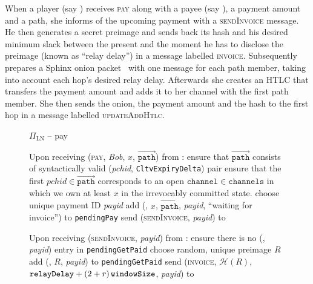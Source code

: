   When a player (say \alice) receives \textsc{pay} along with a payee (say
  \bob), a payment amount and a path, she informs \bob{} of the upcoming payment
  with a \textsc{sendInvoice} message. He then generates a secret preimage and
  sends back its hash and his desired minimum slack between the present and the
  moment he has to disclose the preimage (known as ``relay delay'') in a message
  labelled \textsc{invoice}. Subsequently \alice{} prepares a Sphinx onion
  packet~\cite{sphinx} with one message for each path member, taking into
  account each hop's desired relay delay. Afterwards she creates an HTLC that
  transfers the payment amount and adds it to her channel with the first path
  member. She then sends the onion, the payment amount and the hash to the first
  hop in a message labelled \textsc{updateAddHtlc}.

  \begin{figure}[H]
    \begin{protocolbox}{$\Pi_{\mathrm{LN}}$ -- pay}
      \begin{algorithmic}[1]
        \State Upon receiving (\textsc{pay}, \textit{Bob}, $x$,
        $\overrightarrow{\mathtt{path}}$) from \environment:
        \Indent
          \State ensure that $\overrightarrow{\mathtt{path}}$ consists of
          syntactically valid (\textit{pchid}, \texttt{CltvExpiryDelta}) pair
          \label{alg:protocol:pay:validpath}
          \State ensure that the first $\mathit{pchid} \in
          \overrightarrow{\mathtt{path}}$ corresponds to an open
          $\mathtt{channel} \in \mathtt{channels}$ in which we own at least $x$
          in the irrevocably committed state.
          \label{alg:protocol:pay:validchannel}
          \State choose unique payment ID \textit{payid} 
          \State add (\bob, $x$, $\overrightarrow{\mathtt{path}}$,
          \textit{payid}, ``waiting for invoice'') to \texttt{pendingPay}
          \State send (\textsc{sendInvoice}, \textit{payid}) to \bob{}
          \label{alg:protocol:pay:sendinvoice}
        \EndIndent
        \Statex

        \State Upon receiving (\textsc{sendInvoice}, \textit{payid}) from \bob:
        \Indent
          \State ensure there is no (\bob, \textit{payid}) entry in
          \texttt{pendingGetPaid}
          \State choose random, unique preimage $R$
          \State add (\bob, $R$, \textit{payid}) to \texttt{pendingGetPaid}
          \State send (\textsc{invoice}, $\mathcal{H}(R)$, $\mathtt{relayDelay}
          + \left(2 + r\right)\texttt{windowSize}{}$, \textit{payid}) to \bob{}
        \EndIndent
      \end{algorithmic}
    \end{protocolbox}
    \caption{}
    \label{alg:protocol:pay:outofband}
  \end{figure}

